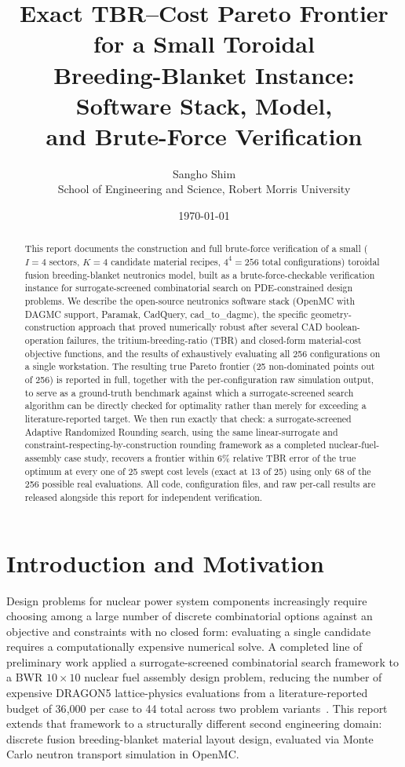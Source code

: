 \documentclass[11pt]{article}
\title{Exact TBR--Cost Pareto Frontier for a Small Toroidal\\
Breeding-Blanket Instance: Software Stack, Model,\\
and Brute-Force Verification}
\author{Sangho Shim \\ \small School of Engineering and Science, Robert Morris University}
\date{\today}
\begin{document}
\maketitle

\begin{abstract}
This report documents the construction and full brute-force verification of a
small ($I=4$ sectors, $K=4$ candidate material recipes, $4^4=256$ total
configurations) toroidal fusion breeding-blanket neutronics model, built as
a brute-force-checkable verification instance for surrogate-screened
combinatorial search on PDE-constrained design problems. We describe the
open-source neutronics software stack (OpenMC with DAGMC support, Paramak,
CadQuery, cad\_to\_dagmc), the specific geometry-construction approach that
proved numerically robust after several CAD boolean-operation failures, the
tritium-breeding-ratio (TBR) and closed-form material-cost objective
functions, and the results of exhaustively evaluating all 256 configurations
on a single workstation. The resulting true Pareto frontier (25
non-dominated points out of 256) is reported in full, together with the
per-configuration raw simulation output, to serve as a ground-truth
benchmark against which a surrogate-screened search algorithm can be
directly checked for optimality rather than merely for exceeding a
literature-reported target. We then run exactly that check: a
surrogate-screened Adaptive Randomized Rounding search, using the same
linear-surrogate and constraint-respecting-by-construction rounding
framework as a completed nuclear-fuel-assembly case study, recovers a
frontier within 6\% relative TBR error of the true optimum at every one of
25 swept cost levels (exact at 13 of 25) using only 68 of the 256 possible
real evaluations. All code, configuration files, and raw per-call results
are released alongside this report for independent verification.
\end{abstract}

\tableofcontents

\section{Introduction and Motivation}

Design problems for nuclear power system components increasingly require
choosing among a large number of discrete combinatorial options against an
objective and constraints with no closed form: evaluating a single candidate
requires a computationally expensive numerical solve. A completed line of
preliminary work applied a surrogate-screened combinatorial search framework
to a BWR $10\times10$ nuclear fuel assembly design problem, reducing the
number of expensive DRAGON5 lattice-physics evaluations from a
literature-reported budget of 36{,}000 per case to 44 total across two
problem variants~\cite{chang2026}. This report extends that framework to a
structurally different second engineering domain: discrete fusion
breeding-blanket material layout design, evaluated via Monte Carlo neutron
transport simulation in OpenMC.
\end{document}
